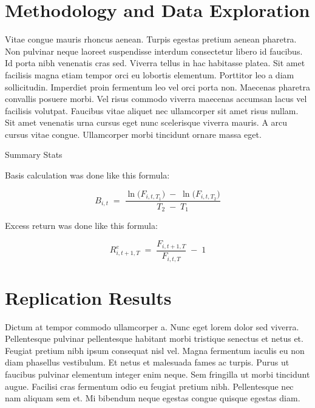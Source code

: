 \documentclass[12pt]{article}
\begin{document}
\newpage

\newpage
\section{Methodology and Data Exploration}

Vitae congue mauris rhoncus aenean. Turpis egestas pretium aenean pharetra.
Non pulvinar neque laoreet suspendisse interdum consectetur libero id
faucibus. Id porta nibh venenatis cras sed. Viverra tellus in hac habitasse
platea. Sit amet facilisis magna etiam tempor orci eu lobortis elementum.
Porttitor leo a diam sollicitudin. Imperdiet proin fermentum leo vel orci
porta non. Maecenas pharetra convallis posuere morbi. Vel risus commodo
viverra maecenas accumsan lacus vel facilisis volutpat. Faucibus vitae
aliquet nec ullamcorper sit amet risus nullam. Sit amet venenatis urna cursus
eget nunc scelerisque viverra mauris. A arcu cursus vitae congue. Ullamcorper
morbi tincidunt ornare massa eget.


\begin{table}[ht!]
    \caption{Summary Stats}
    \centering
    \renewcommand{\arraystretch}{1.2}  
    \setlength{\tabcolsep}{5pt}        
    \begin{adjustbox}{max width=\textwidth}
    
    \end{adjustbox}
    \label{table:sector_settlement_summary}
\end{table}

Basis calculation was done like this formula:

\begin{equation}
    B_{i,t} \;=\; \frac{\ln\bigl(F_{i,t,T_1}\bigr)\;-\;\ln\bigl(F_{i,t,T_2}\bigr)}{\,T_2 \;-\; T_1\,}
  \label{eq:basis_formula}
\end{equation}

Excess return was done like this formula:

\begin{equation}
  R^e_{i,t+1,T} \;=\; \frac{F_{i,t+1,T}}{F_{i,t,T}} \;-\; 1
  \label{eq:return_formula}
\end{equation}


\newpage
\section{Replication Results}

Dictum at tempor commodo ullamcorper a. Nunc eget lorem dolor sed
viverra. Pellentesque pulvinar pellentesque habitant morbi tristique senectus
et netus et. Feugiat pretium nibh ipsum consequat nisl vel. Magna fermentum
iaculis eu non diam phasellus vestibulum. Et netus et malesuada fames ac
turpis. Purus ut faucibus pulvinar elementum integer enim neque. Sem
fringilla ut morbi tincidunt augue. Facilisi cras fermentum odio eu feugiat
pretium nibh. Pellentesque nec nam aliquam sem et. Mi bibendum neque egestas
congue quisque egestas diam.
\end{document}

